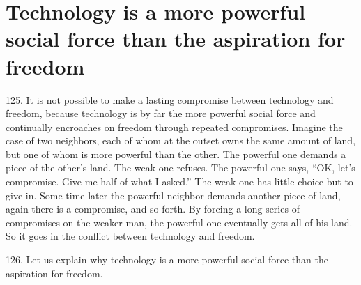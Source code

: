 \documentclass{article}
\begin{document}
\section{Technology is a more powerful social force than the aspiration for freedom}

\hspace{0.5cm} 125.  It is not possible to make a lasting compromise between technology and freedom, because 
technology is by far the more powerful social force and continually encroaches on freedom through 
repeated compromises.  Imagine the case of two neighbors, each of whom at the outset owns the 
same  amount  of  land,  but  one  of  whom  is  more  powerful  than  the  other.   The  powerful  one  
demands a piece of the other’s land.  The weak one refuses.  The powerful one says, “OK, let’s 
compromise.  Give me half of what I asked.” The weak one has little choice but to give in.  Some 
time later the powerful neighbor demands another piece of land, again there is a compromise, and 
so forth.  By forcing a long series of compromises on the weaker man, the powerful one eventually 
gets all of his land.  So it goes in the conflict between technology and freedom. \vspace{\baselineskip}

126.  Let  us  explain  why  technology  is  a  more  powerful  social  force  than  the  aspiration  for  
freedom. \vspace{\baselineskip}
\end{document}
